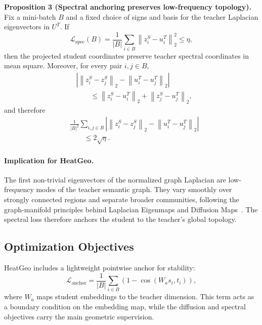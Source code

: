 \smallskip
\noindent\textbf{Proposition 3 (Spectral anchoring preserves low-frequency topology).}
Fix a mini-batch $B$ and a fixed choice of signs and basis for the teacher Laplacian eigenvectors in $U^T$. If
\begin{equation}
    \mathcal{L}_{\mathrm{spec}}(B)
    =
    \frac{1}{|B|}
    \sum_{i\in B}\left\|z_i^S-u_i^T\right\|_2^2
    \le \eta,
\end{equation}
then the projected student coordinates preserve teacher spectral coordinates in mean square. Moreover, for every pair $i,j\in B$,
\begin{equation}
\begin{aligned}
&\left|\left\|z_i^S-z_j^S\right\|_2
-\left\|u_i^T-u_j^T\right\|_2\right|\\
&\qquad\le
\left\|z_i^S-u_i^T\right\|_2
+\left\|z_j^S-u_j^T\right\|_2,
\end{aligned}
\end{equation}
and therefore
\begin{equation}
\begin{aligned}
&\frac{1}{|B|^2}\sum_{i,j\in B}
\left|\left\|z_i^S-z_j^S\right\|_2
-\left\|u_i^T-u_j^T\right\|_2\right|\\
&\qquad\le 2\sqrt{\eta}.
\end{aligned}
\end{equation}

\paragraph{Implication for HeatGeo.}
The first non-trivial eigenvectors of the normalized graph Laplacian are low-frequency modes of the teacher semantic graph. They vary smoothly over strongly connected regions and separate broader communities, following the graph-manifold principles behind Laplacian Eigenmaps and Diffusion Maps~\citep{belkin2003laplacian,coifman2006diffusionmaps}. The spectral loss therefore anchors the student to the teacher's global topology.

\subsection{Optimization Objectives}

HeatGeo includes a lightweight pointwise anchor for stability:
\begin{equation}
    \mathcal{L}_{\mathrm{anchor}}
    =
    \frac{1}{|B|}
    \sum_{i\in B}
    \left(1-\cos(W_a s_i,t_i)\right),
\end{equation}
where $W_a$ maps student embeddings to the teacher dimension. This term acts as a boundary condition on the embedding map, while the diffusion and spectral objectives carry the main geometric supervision.


